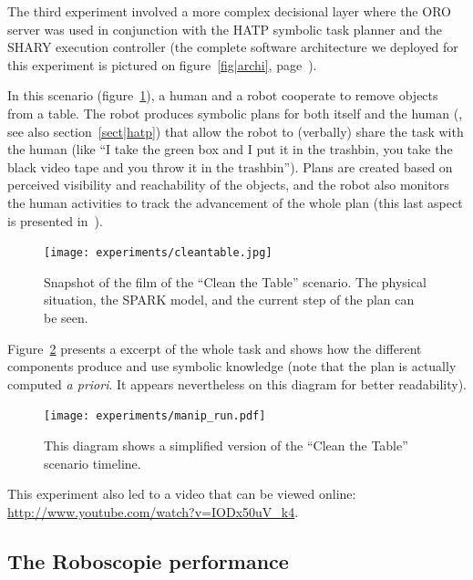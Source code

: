 The third experiment involved a more complex decisional layer where the ORO
server was used in conjunction with the HATP symbolic task planner and the
SHARY execution controller (the complete software architecture we deployed for
this experiment is pictured on figure~\ref{fig|archi},
page~\pageref{fig|archi}).

In this scenario (figure~\ref{fig|cleantable-video}), a human and a robot
cooperate to remove objects from a table. The robot produces symbolic plans for
both itself and the human (\cite{Alami2011}, see also section~\ref{sect|hatp})
that allow the robot to (verbally) share the task with the human (like ``I take
the green box and I put it in the trashbin, you take the black video tape and
you throw it in the trashbin''). Plans are created based on perceived
visibility and reachability of the objects, and the robot also monitors the
human activities to track the advancement of the whole plan (this last aspect
is presented in~\cite{Warnier2012}).

\begin{figure}
    \centering
    \texttt{[image: experiments/cleantable.jpg]}

    \caption{Snapshot of the film of the ``Clean the Table'' scenario. The
    physical situation, the SPARK model, and the current step of the plan can
    be seen.}

    \label{fig|cleantable-video}
\end{figure}


Figure~\ref{fig|cleantable-timeline} presents a excerpt of the whole task and
shows how the different components produce and use symbolic knowledge (note
that the plan is actually computed {\it a priori}. It appears nevertheless on
this diagram for better readability).

\begin{figure}
    \centering
    \texttt{[image: experiments/manip\_run.pdf]}

    \caption{This diagram shows a simplified version of the ``Clean the Table'' scenario timeline.}

    \label{fig|cleantable-timeline}
\end{figure}


This experiment also led to a video that can be viewed online:
\url{http://www.youtube.com/watch?v=IODx50uV_k4}.


\subsection{The Roboscopie performance}
\label{sect|roboscopie}

